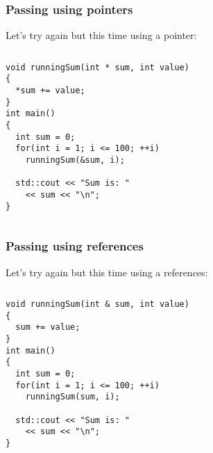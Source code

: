 \documentclass{beamer}
\begin{document}
\begin{frame}[fragile]
  \frametitle{Passing using pointers}
  
  Let's try again but this time using a pointer:
  \begin{columns}[t]
    \begin{column}[T]{0.6\textwidth}
	    \begin{lstlisting}[aboveskip=0pt]
void runningSum(int * sum, int value)
{
  *sum += value;
}
int main()
{
  int sum = 0;
  for(int i = 1; i <= 100; ++i)
    runningSum(&sum, i);
    
  std::cout << "Sum is: "
    << sum << "\n";
}
      \end{lstlisting}
    \end{column}
    \begin{column}[T]{0.4\textwidth}
    \end{column}
  \end{columns}
  
\end{frame}

\begin{frame}[fragile]
  \frametitle{Passing using references}
  
  Let's try again but this time using a references:
  \begin{columns}[t]
    \begin{column}[T]{0.6\textwidth}
	    \begin{lstlisting}[aboveskip=0pt]
void runningSum(int & sum, int value)
{
  sum += value;
}
int main()
{
  int sum = 0;
  for(int i = 1; i <= 100; ++i)
    runningSum(sum, i);
    
  std::cout << "Sum is: "
    << sum << "\n";
}
      \end{lstlisting}
    \end{column}
    \begin{column}[T]{0.4\textwidth}
    \end{column}
  \end{columns}
  
\end{frame}
\end{document}
